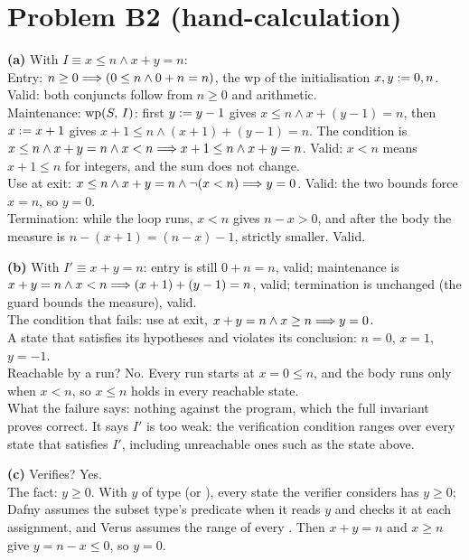 \documentclass[11pt]{article}
\begin{document}
\section*{Problem B2 (hand-calculation)}\label{ans:B2}
\begin{answer}
\textbf{(a)} With $I \equiv x \leq n \wedge x + y = n$: \\
Entry: $n \geq 0 \Longrightarrow (0 \leq n \wedge 0 + n = n)$, the wp of the
initialisation $x, y \mathrel{:=} 0, n$. Valid: both conjuncts follow from
$n \geq 0$ and arithmetic. \\
Maintenance: $\mathrm{wp}(S,\,I)$: first $y \mathrel{:=} y - 1$ gives
$x \leq n \wedge x + (y - 1) = n$, then $x \mathrel{:=} x + 1$ gives
$x + 1 \leq n \wedge (x + 1) + (y - 1) = n$. The condition is
$x \leq n \wedge x + y = n \wedge x < n \Longrightarrow x + 1 \leq n \wedge x + y = n$.
Valid: $x < n$ means $x + 1 \leq n$ for integers, and the sum does not change. \\
Use at exit: $x \leq n \wedge x + y = n \wedge \neg(x < n) \Longrightarrow y = 0$. Valid:
the two bounds force $x = n$, so $y = 0$. \\
Termination: while the loop runs, $x < n$ gives $n - x > 0$, and after the
body the measure is $n - (x + 1) = (n - x) - 1$, strictly smaller. Valid.

\textbf{(b)} With $I' \equiv x + y = n$: entry is still $0 + n = n$, valid;
maintenance is $x + y = n \wedge x < n \Longrightarrow (x + 1) + (y - 1) = n$, valid;
termination is unchanged (the guard bounds the measure), valid. \\
The condition that fails: use at exit, $x + y = n \wedge x \geq n \Longrightarrow y = 0$. \\
A state that satisfies its hypotheses and violates its conclusion: $n = 0$,
$x = 1$, $y = -1$. \\
Reachable by a run? No. Every run starts at $x = 0 \leq n$, and the body runs
only when $x < n$, so $x \leq n$ holds in every reachable state. \\
What the failure says: nothing against the program, which the full invariant
proves correct. It says $I'$ is too weak: the verification condition ranges
over every state that satisfies $I'$, including unreachable ones such as the
state above.

\textbf{(c)} Verifies? Yes. \\
The fact: $y \geq 0$. With $y$ of type  (or ), every state
the verifier considers has $y \geq 0$; Dafny assumes the subset type's
predicate when it reads $y$ and checks it at each assignment, and Verus
assumes the range of every . Then $x + y = n$ and $x \geq n$ give
$y = n - x \leq 0$, so $y = 0$.
\end{answer}
\end{document}

